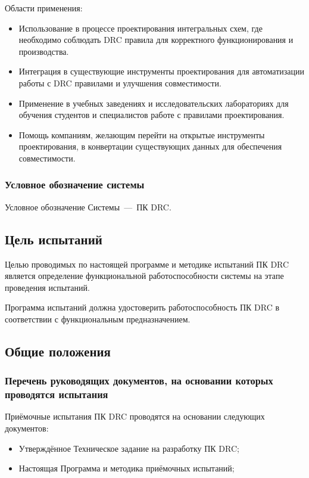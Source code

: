 Области применения:

\begin{itemize}
	\item Использование в процессе проектирования интегральных схем,
		где необходимо соблюдать DRC правила
		для корректного функционирования и производства.
	\item Интеграция в существующие инструменты проектирования
		для автоматизации работы с DRC правилами и улучшения совместимости.
	\item Применение в учебных заведениях
		и исследовательских лабораториях для обучения студентов
		и специалистов работе с правилами проектирования.
	\item Помощь компаниям, желающим перейти
		на открытые инструменты проектирования,
		в конвертации существующих данных для обеспечения совместимости.
\end{itemize}

\subsubsection{Условное обозначение системы}

Условное обозначение Системы --- ПК DRC.

\subsection{Цель испытаний}

Целью проводимых по настоящей программе и методике испытаний ПК DRC
является определение функциональной работоспособности системы
на этапе проведения испытаний. 

Программа испытаний должна удостоверить работоспособность ПК DRC
в соответствии с функциональным предназначением.

\subsection{Общие положения}

\subsubsection{Перечень руководящих документов,
	на основании которых проводятся испытания}

Приёмочные испытания ПК DRC проводятся на основании следующих документов:

\begin{itemize}
	\item Утверждённое Техническое задание на разработку ПК DRC;
	\item Настоящая Программа и методика приёмочных испытаний;
\end{itemize}

